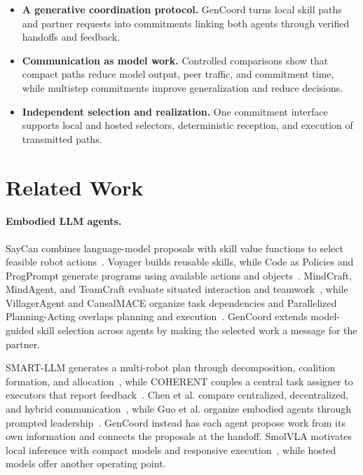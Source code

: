 \documentclass[sigconf,nonacm,balance=false]{aamas}
\begin{document}
\begin{itemize}
\item \textbf{A generative coordination protocol.} GenCoord turns local skill paths and partner requests into commitments linking both agents through verified handoffs and feedback.
\item \textbf{Communication as model work.} Controlled comparisons show that compact paths reduce model output, peer traffic, and commitment time, while multistep commitments improve generalization and reduce decisions.
\item \textbf{Independent selection and realization.} One commitment interface supports local and hosted selectors, deterministic reception, and execution of transmitted paths.
\end{itemize}

\section{Related Work}
\paragraph{Embodied LLM agents.}
SayCan combines language-model proposals with skill value functions to select feasible robot actions~\cite{ichter2023saycan}. Voyager builds reusable skills, while Code as Policies and ProgPrompt generate programs using available actions and objects~\cite{wang2023voyager,liang2023code,singh2023progprompt}. MindCraft, MindAgent, and TeamCraft evaluate situated interaction and teamwork~\cite{bara2021mindcraft,gong2024mindagent,long2024teamcraft}, while VillagerAgent and CausalMACE organize task dependencies and Parallelized Planning-Acting overlaps planning and execution~\cite{dong2024villageragent,chai2025causalmace,aamas2026_EXAJ9853}. GenCoord extends model-guided skill selection across agents by making the selected work a message for the partner.

SMART-LLM generates a multi-robot plan through decomposition, coalition formation, and allocation~\cite{kannan2023smart}, while COHERENT couples a central task assigner to executors that report feedback~\cite{liu2025coherent}. Chen et al. compare centralized, decentralized, and hybrid communication~\cite{chen2024scalable}, while Guo et al. organize embodied agents through prompted leadership~\cite{guo2026organized}. GenCoord instead has each agent propose work from its own information and connects the proposals at the handoff. SmolVLA motivates local inference with compact models and responsive execution~\cite{shukor2025smolvla}, while hosted models offer another operating point.
\end{document}
